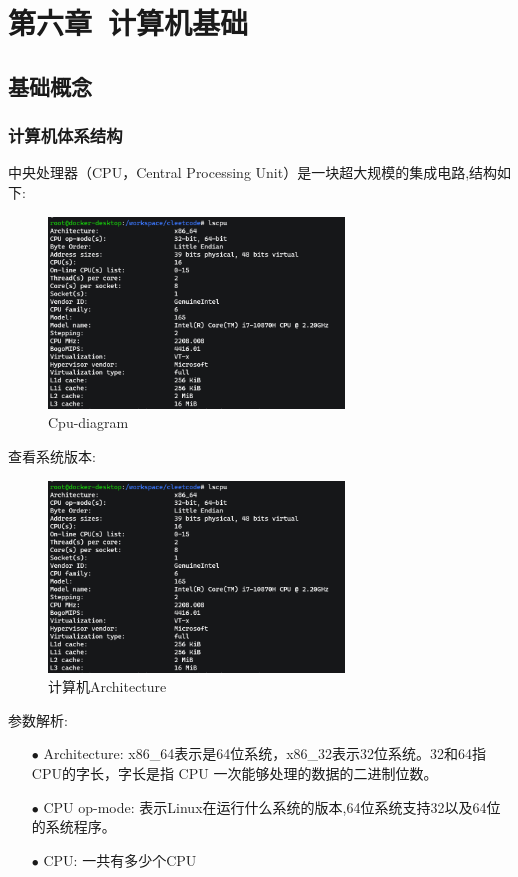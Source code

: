 \documentclass[12pt]{book}
\begin{document}
\newpage

\fancyhead{}

\chapter{第六章\ 计算机基础}
\section{基础概念}
\subsection{计算机体系结构}
中央处理器（CPU，Central Processing Unit）是一块超大规模的集成电路,结构如下:
\begin{figure}[H]
	\centering
	\includegraphics[width=0.7\textwidth]{images/cpu_architecture.png}
	\caption{Cpu-diagram}
	\label{Cpu-diagram}
\end{figure}

查看系统版本:
\begin{figure}[H]
	\centering
	\includegraphics[width=0.7\textwidth]{images/cpu_architecture.png}
	\caption{计算机Architecture}
	\label{cpu-architecture}
\end{figure}
参数解析:\newline
\begin{itemize}
\item[$\bullet$] Architecture: x86\_64表示是64位系统，x86\_32表示32位系统。32和64指CPU的字长，字长是指 CPU 一次能够处理的数据的二进制位数。
\item[$\bullet$] CPU op-mode: 表示Linux在运行什么系统的版本,64位系统支持32以及64位的系统程序。
\item[$\bullet$] CPU: 一共有多少个CPU
\end{itemize}
\end{document}
